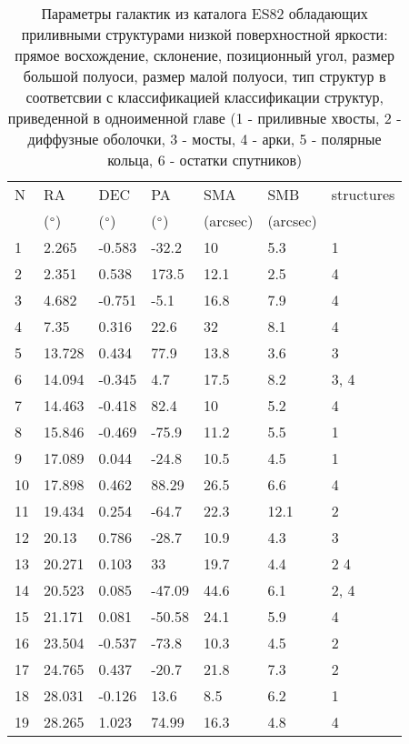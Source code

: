 \begin{longtable}{|l|l|l|l|l|l|l|}
\caption{Параметры галактик из каталога ES82 обладающих приливными структурами низкой поверхностной яркости: прямое восхождение, склонение, позиционный угол, размер большой полуоси, размер малой полуоси, тип структур в соответсвии с классификацией  классификации структур, приведенной в одноименной главе (1 - приливные хвосты, 2 - диффузные оболочки, 3 - мосты, 4 - арки, 5 - полярные кольца, 6 - остатки спутников)} \label{tab:tab1}  \\ \hline
N & RA & DEC & PA  & SMA  & SMB  & structures \\ 
 &($\degree$) & ($\degree$) & ($\degree$) & (arcsec) & (arcsec) & \\ \hline\hline
        1 & 2.265 & -0.583 & -32.2 & 10 & 5.3 & 1 \\ 
        2 & 2.351 & 0.538 & 173.5 & 12.1 & 2.5 & 4 \\ 
        3 & 4.682 & -0.751 & -5.1 & 16.8 & 7.9 & 4 \\ 
        4 & 7.35 & 0.316 & 22.6 & 32 & 8.1 & 4 \\ 
        5 & 13.728 & 0.434 & 77.9 & 13.8 & 3.6 & 3 \\ 
        6 & 14.094 & -0.345 & 4.7 & 17.5 & 8.2 & 3, 4 \\ 
        7 & 14.463 & -0.418 & 82.4 & 10 & 5.2 & 4 \\ 
        8 & 15.846 & -0.469 & -75.9 & 11.2 & 5.5 & 1 \\ 
        9 & 17.089 & 0.044 & -24.8 & 10.5 & 4.5 & 1 \\ 
        10 & 17.898 & 0.462 & 88.29 & 26.5 & 6.6 & 4 \\ 
        11 & 19.434 & 0.254 & -64.7 & 22.3 & 12.1 & 2 \\ 
        12 & 20.13 & 0.786 & -28.7 & 10.9 & 4.3 & 3 \\ 
        13 & 20.271 & 0.103 & 33 & 19.7 & 4.4 & 2 4 \\ 
        14 & 20.523 & 0.085 & -47.09 & 44.6 & 6.1 & 2, 4 \\ 
        15 & 21.171 & 0.081 & -50.58 & 24.1 & 5.9 & 4 \\ 
        16 & 23.504 & -0.537 & -73.8 & 10.3 & 4.5 & 2 \\ 
        17 & 24.765 & 0.437 & -20.7 & 21.8 & 7.3 & 2 \\ 
        18 & 28.031 & -0.126 & 13.6 & 8.5 & 6.2 & 1 \\ 
        19 & 28.265 & 1.023 & 74.99 & 16.3 & 4.8 & 4 \\ 

\end{longtable}
